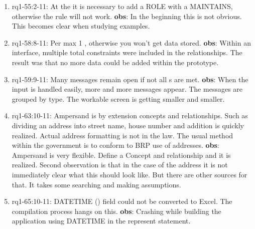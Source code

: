 \begin{enumerate}
    \item rq1-55:2-11: At the  it is necessary to add a ROLE with a MAINTAINS, otherwise the rule will not work.
    \newline\textbf{obs}: In the beginning this is not obvious.
    This becomes clear when studying examples.
     
    
    \item rq1-58:8-11: Per  max 1 , otherwise you won't get data stored.
    \newline\textbf{obs}: Within an interface, multiple total constraints were included in the relationships.
    The result was that no more data could be added within the prototype.

    \item rq1-59:9-11: Many messages remain open if not all s are met.
    \newline\textbf{obs}: When the input is handled easily, more and more messages appear.
    The messages are grouped by type.
    The workable screen is getting smaller and smaller.    
    
    \item rq1-63:10-11: Ampersand is  by extension concepts and relationships.
    Such as dividing an address into street name, house number and addition is quickly realized.
    Actual address formatting is not in the law.
    The usual method within the government is to conform to BRP use of addresses.
    \newline\textbf{obs}: Ampersand is very flexible.
    Define a Concept and relationship and it is realized.
    Second observation is that in the case of the address it is not immediately clear what this should look like.
    But there are other sources for that.
    It takes some searching and making assumptions.
     
    
    \item rq1-65:10-11: DATETIME () field could not be converted to Excel.
    The compilation process hangs on this.
    \newline\textbf{obs}: Crashing while building the application using DATETIME in the represent statement.
     

\end{enumerate}
